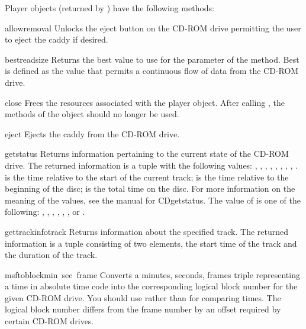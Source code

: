 Player objects (returned by ) have the following
methods:


\begin{funcdesc}{allowremoval}{}
Unlocks the eject button on the CD-ROM drive permitting the user to
eject the caddy if desired.
\end{funcdesc}

\begin{funcdesc}{bestreadsize}{}
Returns the best value to use for the  parameter of
the  method.  Best is defined as the value that permits a
continuous flow of data from the CD-ROM drive.
\end{funcdesc}

\begin{funcdesc}{close}{}
Frees the resources associated with the player object.  After calling
, the methods of the object should no longer be used.
\end{funcdesc}

\begin{funcdesc}{eject}{}
Ejects the caddy from the CD-ROM drive.
\end{funcdesc}

\begin{funcdesc}{getstatus}{}
Returns information pertaining to the current state of the CD-ROM
drive.  The returned information is a tuple with the following values:
, , , , ,
, , , .
 is the time relative to the start of the current track;
 is the time relative to the beginning of the disc;
 is the total time on the disc.  For more information on
the meaning of the values, see the manual for CDgetstatus.
The value of  is one of the following: ,
, , ,
, , or .
\end{funcdesc}

\begin{funcdesc}{gettrackinfo}{track}
Returns information about the specified track.  The returned
information is a tuple consisting of two elements, the start time of
the track and the duration of the track.
\end{funcdesc}

\begin{funcdesc}{msftoblock}{min\, sec\, frame}
Converts a minutes, seconds, frames triple representing a time in
absolute time code into the corresponding logical block number for the
given CD-ROM drive.  You should use  rather than
 for comparing times.  The logical block number
differs from the frame number by an offset required by certain CD-ROM
drives.
\end{funcdesc}

